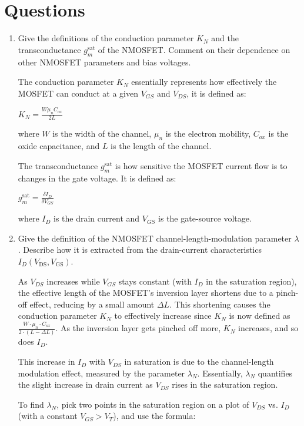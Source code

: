\documentclass[12pt]{article}
\begin{document}
\section{Questions}
\begin{enumerate}
\item Give the definitions of the conduction parameter $K_N$ and the transconductance $g_m^\mathrm{sat}$ of the NMOSFET. Comment on their dependence on other NMOSFET parameters and bias voltages.

The conduction parameter $K_N$ essentially represents how effectively the MOSFET can conduct at a given $V_{GS}$ and $V_{DS}$, it is defined as:

$K_N = \frac{W \mu _n C_{ox}}{2L}$

where $W$ is the width of the channel, $\mu _n$ is the electron mobility, $C_{ox}$ is the oxide capacitance, and $L$ is the length of the channel. 

The transconductance $g_m^\mathrm{sat}$ is how sensitive the MOSFET current flow is to changes in the gate voltage. It is defined as:

$g_m^\mathrm{sat} = \frac{\delta I_{D}}{\delta V_{GS}}$

where $I_D$ is the drain current and $V_{GS}$ is the gate-source voltage.

\item Give the definition of the NMOSFET channel-length-modulation parameter $\lambda$. Describe how it is extracted from the drain-current characteristics $I_D(V_{\mathrm{DS}}, V_{\mathrm{GS}})$.

As \( V_{DS} \) increases while \( V_{GS} \) stays constant (with \( I_D \) in the saturation region), the effective length of the MOSFET’s inversion layer shortens due to a pinch-off effect, reducing by a small amount \( \Delta L \). This shortening causes the conduction parameter \( K_N \) to effectively increase since \( K_N \) is now defined as \( \frac{W \cdot \mu_n \cdot C_{ox}}{2 \cdot (L - \Delta L)} \). As the inversion layer gets pinched off more, \( K_N \) increases, and so does \( I_D \). 

This increase in \( I_D \) with \( V_{DS} \) in saturation is due to the channel-length modulation effect, measured by the parameter \( \lambda_N \). Essentially, \( \lambda_N \) quantifies the slight increase in drain current as \( V_{DS} \) rises in the saturation region.

To find \( \lambda_N \), pick two points in the saturation region on a plot of \( V_{DS} \) vs. \( I_D \) (with a constant \( V_{GS} > V_{T} \)), and use the formula:


\end{enumerate}
\end{document}
